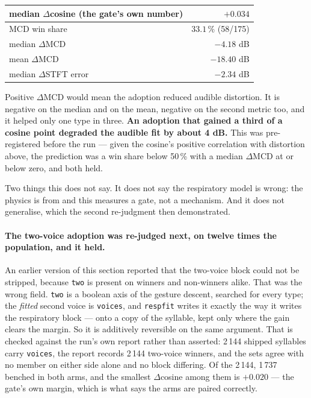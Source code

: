 \documentclass[10pt,twocolumn,a4paper]{article}
\begin{document}
\begin{center}\footnotesize
\setlength{\tabcolsep}{5pt}
\begin{tabular}{@{}l r@{}}
\toprule
median $\Delta$cosine (the gate's own number) & $\mathbf{+0.034}$ \\
\midrule
MCD win share & $\mathbf{33.1\,\%}$ (58/175) \\
median $\Delta$MCD & $\mathbf{-4.18}$ dB \\
mean $\Delta$MCD & $-18.40$ dB \\
median $\Delta$STFT error & $-2.34$ dB \\
\bottomrule
\end{tabular}
\end{center}

Positive $\Delta$MCD would mean the adoption reduced audible distortion. It is negative on the
median and on the mean, negative on the second metric too, and it helped only one type in
three. \textbf{An adoption that gained a third of a cosine point degraded the audible fit by
about 4 dB.} This was pre-registered before the run --- given the cosine's positive correlation
with distortion above, the prediction was a win share below 50\,\% with a median
$\Delta$MCD at or below zero, and both held.

Two things this does not say. It does not say the respiratory model is wrong: the physics is
from \citet{fainstein2025} and this measures a gate, not a mechanism. And it does not
generalise, which the second re-judgment then demonstrated.

\paragraph{The two-voice adoption was re-judged next, on twelve times the population, and it
held.} An earlier version of this section reported that the two-voice block could not be
stripped, because \texttt{two} is present on winners and non-winners alike. That was the wrong
field. \texttt{two} is a boolean axis of the gesture descent, searched for every type; the
\emph{fitted} second voice is \texttt{voices}, and \texttt{respfit} writes it exactly the way
it writes the respiratory block --- onto a copy of the syllable, kept only where the gain clears
the margin. So it is additively reversible on the same argument. That is checked against the
run's own report rather than asserted: 2\,144 shipped syllables carry \texttt{voices}, the
report records 2\,144 two-voice winners, and the sets agree with no member on either side alone
and no block differing. Of the 2\,144, 1\,737 benched in both arms, and the smallest
$\Delta$cosine among them is $+0.020$ --- the gate's own margin, which is what says the arms are
paired correctly.
\end{document}
